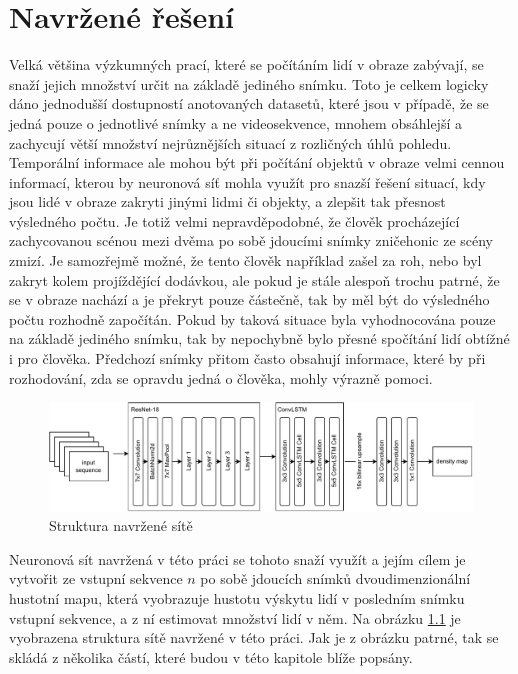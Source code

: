 \chapter{Navržené řešení}
\label{sec:Propesed_solution}

Velká většina výzkumných prací, které se počítáním lidí v obraze zabývají, se snaží jejich množství určit na základě jediného snímku.
Toto je celkem logicky dáno jednodušší dostupností anotovaných datasetů, které jsou v případě, že se jedná pouze o jednotlivé snímky a ne videosekvence, mnohem obsáhlejší a zachycují větší množství nejrůznějších situací z rozličných úhlů pohledu.
Temporální informace ale mohou být při počítání objektů v obraze velmi cennou informací, kterou by neuronová síť mohla využít pro snazší řešení situací, kdy jsou lidé v obraze zakryti jinými lidmi či objekty, a zlepšit tak přesnost výsledného počtu.
Je totiž velmi nepravděpodobné, že člověk procházející zachycovanou scénou mezi dvěma po sobě jdoucími snímky zničehonic ze scény zmizí.
Je samozřejmě možné, že tento člověk například zašel za roh, nebo byl zakryt kolem projíždějící dodávkou, ale pokud je stále alespoň trochu patrné, že se v obraze nachází a je překryt pouze částečně, tak by měl být do výsledného počtu rozhodně započítán. Pokud by taková situace byla vyhodnocována pouze na základě jediného snímku, tak by nepochybně bylo přesné spočítání lidí obtížné i pro člověka. Předchozí snímky přitom často obsahují informace, které by při rozhodování, zda se opravdu jedná o člověka, mohly výrazně pomoci.

\begin{figure}[h!]
	\centering
	\includegraphics[width=\textwidth]{Figures/solution/net_structure.pdf}
	\caption{Struktura navržené sítě}
	\label{fig:proposed_net}
\end{figure}

Neuronová sít navržená v této práci se tohoto snaží využít a jejím cílem je vytvořit ze vstupní sekvence \(n\) po sobě jdoucích snímků dvoudimenzionální hustotní mapu, která vyobrazuje hustotu výskytu lidí v posledním snímku vstupní sekvence, a z ní estimovat množství lidí v něm. Na obrázku \ref{fig:proposed_net} je vyobrazena struktura sítě navržené v této práci.
Jak je z obrázku patrné, tak se skládá z několika částí, které budou v této kapitole blíže popsány.





\endinput